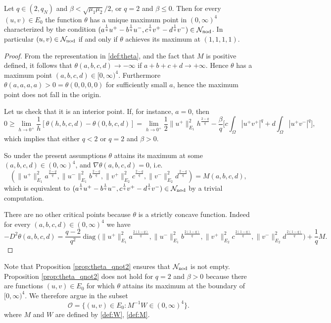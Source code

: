 \documentclass[reqno]{amsart}
\begin{document}
\begin{lemma}\label{prop:theta_qnot2}
Let $q\in (2,q_N)$ and $\beta<\sqrt{\mu_1\mu_2}/2$, or $q=2$ and $\beta \le 0$.
Then for every $(u,v)\in  E_0$  the function
$\theta$ has a unique maximum point in $ (0,\infty)^4$ characterized by the condition
$(a^{\frac{1}q} u^+ -b^{\frac{1}q} u^-, c^{\frac{1}q} v^+ -d^{\frac{1}q} v^-)
 \in \mathcal N_{\rm nod}$.
In particular $(u,v)\in \mathcal N_{\rm nod}$ if and only if $\theta$ achieves its
maximum at $(1,1,1,1)$.
\end{lemma}

\begin{proof}
From the representation in \eqref{def:theta}, and the fact that $M$ is positive defined,
it follows that $\theta(a,b,c,d) \to -\infty$ if $a+b+c+d \to + \infty$. Hence $\theta$
has a maximum point $(a,b,c,d) \in [0,\infty)^4$.
Furthermore $\theta(a,a,a,a)>0=\theta(0,0,0,0)$ for sufficiently small $a$, hence the
maximum point does not fall in the origin.

Let us check that it is an interior point.
If, for instance, $a=0$, then
\[
0\ge \lim_{h\to 0^+} \frac{1}{h}\left[\theta(h, b,c,d) -  \theta(0, b,c,d)\right]
= \lim_{h\to 0^+} \frac{1}{2} \|u^+\|_{E_1}^2 h^{\frac{2-q}q}
- \frac{\beta}{q} \Big[ c \int_{\Omega} |u^+v^+|^q + d \int_{\Omega} |u^+v^-|^q \Big] ,
\]
which implies that either $q <2$ or $q=2$ and $\beta >0$.

So under the present assumptions $\theta$ attains its maximum at some
$(a,b,c,d) \in (0,\infty)^4$, and $\nabla \theta (a,b,c,d)=0$, i.e.
\[
 \left( \|u^+\|_{E_1}^2 a^{\frac{2-q}{q}} , \|u^-\|_{E_1}^2 b^{\frac{2-q}{q}},
 \|v^+\|_{E_2}^2 c^{\frac{2-q}{q}}, \|v^-\|_{E_2}^2 d^{\frac{2-q}{q}}\right)
= M (a,b,c,d) ,
\]
which is equivalent to
$(a^{\frac{1}q} u^+ -b^{\frac{1}q} u^-, c^{\frac{1}q} v^+ -d^{\frac{1}q} v^-)
\in \mathcal N_{\rm nod}$ by a trivial computation.

There are no other  critical points   because $\theta$ is a strictly concave function.
Indeed for every $(a,b,c,d)\in (0,\infty)^4$ we have
\[
- D^2\theta(a,b,c,d) =\frac{q-2}{q^2}
\operatorname{diag}\Big( \|u^+\|_{E_1}^2 a^{\frac{2(1-q)}{q}} ,
\|u^-\|_{E_1}^2 b^{\frac{2(1-q)}{q}}, \|v^+\|_{E_2}^2 c^{\frac{2(1-q)}{q}},
\|v^-\|_{E_2}^2 d^{\frac{2(1-q)}{q}}\Big)
+ \frac{1}q M .
\]
\end{proof}

Note that Proposition \ref{prop:theta_qnot2}  ensures that
$\mathcal N_{\rm nod}$ is not empty.
Proposition \ref{prop:theta_qnot2} does not hold for $q=2$ and $\beta > 0$ because
there are functions $(u,v)\in E_{0}$ for which $\theta$ attains its maximum at the
boundary of $[0,\infty)^4$. We therefore argue in the subset
\begin{equation}\label{def:O}
 \mathcal O = \{ (u,v) \in E_0 :  M^{-1} W \in (0,\infty)^4\} .
\end{equation}
where $M$ and $W$ are defined by \eqref{def:W}, \eqref{def:M}.
\end{document}
